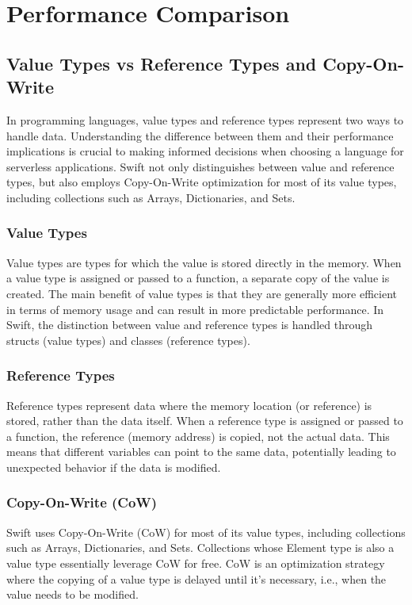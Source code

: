 \chapter{Performance Comparison}
\section{Value Types vs Reference Types and Copy-On-Write}

In programming languages, value types and reference types represent two ways to handle data. Understanding the difference between them and their performance implications is crucial to making informed decisions when choosing a language for serverless applications. Swift not only distinguishes between value and reference types, but also employs Copy-On-Write optimization for most of its value types, including collections such as Arrays, Dictionaries, and Sets.

\subsection{Value Types}

Value types are types for which the value is stored directly in the memory. When a value type is assigned or passed to a function, a separate copy of the value is created. The main benefit of value types is that they are generally more efficient in terms of memory usage and can result in more predictable performance. In Swift, the distinction between value and reference types is handled through structs (value types) and classes (reference types).

\subsection{Reference Types}

Reference types represent data where the memory location (or reference) is stored, rather than the data itself. When a reference type is assigned or passed to a function, the reference (memory address) is copied, not the actual data. This means that different variables can point to the same data, potentially leading to unexpected behavior if the data is modified.

\subsection{Copy-On-Write (CoW)}

Swift uses Copy-On-Write (CoW) for most of its value types, including collections such as Arrays, Dictionaries, and Sets. Collections whose Element type is also a value type essentially leverage CoW for free. CoW is an optimization strategy where the copying of a value type is delayed until it's necessary, i.e., when the value needs to be modified.

